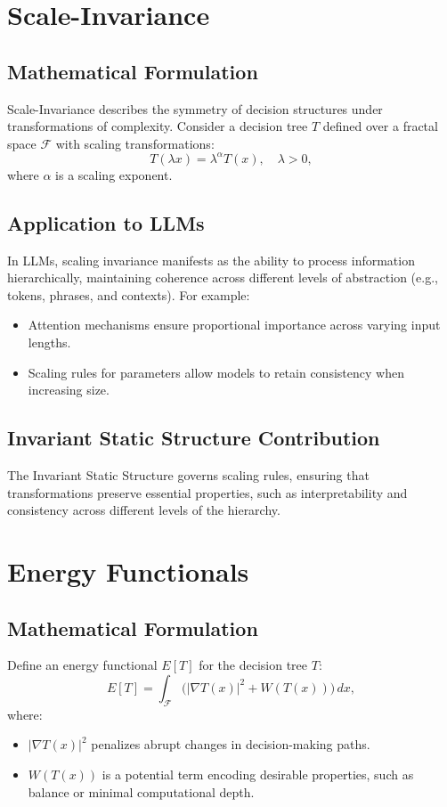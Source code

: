 \documentclass[12pt]{article}
\begin{document}
\section{Scale-Invariance}

\subsection{Mathematical Formulation}
Scale-Invariance describes the symmetry of decision structures under transformations of complexity. Consider a decision tree $T$ defined over a fractal space $\mathcal{F}$ with scaling transformations:
\begin{equation}
T(\lambda x) = \lambda^\alpha T(x), \quad \lambda > 0,
\end{equation}
where $\alpha$ is a scaling exponent.

\subsection{Application to LLMs}
In LLMs, scaling invariance manifests as the ability to process information hierarchically, maintaining coherence across different levels of abstraction (e.g., tokens, phrases, and contexts). For example:
\begin{itemize}
    \item Attention mechanisms ensure proportional importance across varying input lengths.
    \item Scaling rules for parameters allow models to retain consistency when increasing size.
\end{itemize}

\subsection{Invariant Static Structure Contribution}
The Invariant Static Structure governs scaling rules, ensuring that transformations preserve essential properties, such as interpretability and consistency across different levels of the hierarchy.

\section{Energy Functionals}

\subsection{Mathematical Formulation}
Define an energy functional $E[T]$ for the decision tree $T$:
\begin{equation}
E[T] = \int_\mathcal{F} \Big( |\nabla T(x)|^2 + W(T(x)) \Big) \, dx,
\end{equation}
where:
\begin{itemize}
    \item $|\nabla T(x)|^2$ penalizes abrupt changes in decision-making paths.
    \item $W(T(x))$ is a potential term encoding desirable properties, such as balance or minimal computational depth.
\end{itemize}
\end{document}
